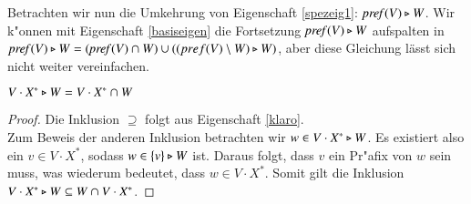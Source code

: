 Betrachten wir nun die Umkehrung von Eigenschaft \ref{spezeig1}: $\mathit{pref{(}}V)\triangleright W$. Wir k"onnen mit Eigenschaft \ref{basiseigen} die Fortsetzung $\mathit{pref{(}}V)\triangleright W$ aufspalten in $\mathit{pref{(}}V)\triangleright W= (\mathit{pref{(}}V)\cap W) \cup ((pref(V)\setminus W)\triangleright W)$, aber diese Gleichung lässt sich nicht weiter vereinfachen.


\vspace{2ex}

\begin{eigen}
$V\cdot X^* \triangleright W = V\cdot X^* \cap W$
\end{eigen}
\begin{proof}
Die Inklusion $\supseteq$ folgt aus Eigenschaft \ref{klaro}.\\
Zum Beweis der anderen Inklusion betrachten wir $w\in V\cdot X^* \triangleright W$. Es existiert also ein $v\in V\cdot X^*$, sodass $w\in \{v\}\triangleright W$ ist. Daraus folgt, dass $v$ ein Pr"afix von $w$ sein muss, was wiederum bedeutet, dass $w\in V\cdot X^*$. Somit gilt die Inklusion $V\cdot X^* \triangleright W \subseteq W\cap V\cdot X^*$.
\end{proof}


